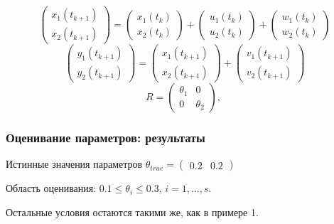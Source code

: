 \documentclass[a4paper,14pt]{extarticle}
\newcommand{\fut}[0]{t_{k+1}}
\begin{document}
\[
  \begin{pmatrix} x_1(\fut) \\ x_2(\fut) \end{pmatrix} =
  \begin{pmatrix} x_1(t_k) \\ x_2(t_k) \end{pmatrix} +
  \begin{pmatrix} u_1(t_k) \\ u_2(t_k) \end{pmatrix}
  + \begin{pmatrix} w_1(t_k) \\ w_2(t_k) \end{pmatrix}
\]
\[
  \begin{pmatrix} y_1(\fut) \\ y_2(\fut) \end{pmatrix} =
  \begin{pmatrix} x_1(\fut) \\ x_2(\fut) \end{pmatrix} +
  \begin{pmatrix} v_1(\fut) \\ v_2(\fut) \end{pmatrix}
\]
\[
  R = \begin{pmatrix} \theta_1 & 0 \\ 0 & \theta_2 \end{pmatrix},\
\]

\subsubsection{Оценивание параметров: результаты}

Истинные значения параметров
$\theta_{true} = \begin{pmatrix} 0.2 & 0.2 \end{pmatrix}$

Область оценивания: $0.1 \le \theta_i \le 0.3$, $i = 1, \ldots, s$.

Остальные условия остаются такими же, как в примере 1.
\end{document}
